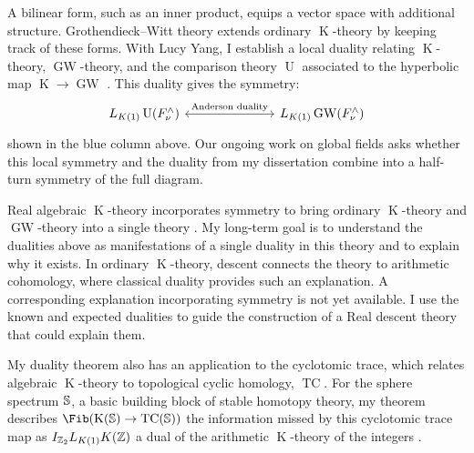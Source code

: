 \documentclass[10pt]{article}
\newcommand{\K}{\operatorname{K}}
\newcommand{\GW}{\operatorname{GW}}
\newcommand{\U}{\operatorname{U}}
\begin{document}
\begin{center}
\end{center}

A bilinear form, such as an inner product, equips a vector space with additional structure.
Grothendieck--Witt theory extends ordinary $\K$-theory by keeping track of these forms.
With Lucy Yang, I establish a local duality relating $\K$-theory, $\GW$-theory, and the comparison theory $\U$ associated to the hyperbolic map $\K\to\GW$ \cite{ChoYang}.
This duality gives the symmetry:
\[
\begin{tikzcd}[column sep=7em]
L_{K(1)}\operatorname{U}(F_\nu^\wedge) 
\arrow[r, leftrightarrow, "\text{Anderson duality}"]
&
L_{K(1)}\GW(F_\nu^\wedge)
\end{tikzcd}
\]
shown in the blue column above.
Our ongoing work on global fields asks whether this local symmetry and the duality from my dissertation combine into a half-turn symmetry of the full diagram.


Real algebraic $\K$-theory incorporates symmetry to bring ordinary $\K$-theory and $\GW$-theory into a single theory \cite{HMreal}.
My long-term goal is to understand the dualities above as manifestations of a single duality in this theory and to explain why it exists.
In ordinary $\K$-theory, descent connects the theory to arithmetic cohomology, where classical duality provides such an explanation.
A corresponding explanation incorporating symmetry is not yet available.
I use the known and expected dualities to guide the construction of a Real descent theory that could explain them.

My duality theorem also has an application to the cyclotomic trace, which relates algebraic $\K$-theory to topological cyclic homology, $\operatorname{TC}$.
For the sphere spectrum $\mathbb{S}$, a basic building block of stable homotopy theory, my theorem describes $\Fib(\K(\bS) \to \operatorname{TC}(\bS))$ the information missed by this cyclotomic trace map as $I_{\mathbb{Z}_2} L_{K(1)}K(\mathbb{Z})$ a dual of the arithmetic $\K$-theory of the integers \cite{Cho}.
\end{document}
